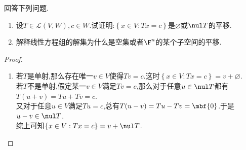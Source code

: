 \documentclass{ctexart}
\begin{document}
\begin{problem}[8.]
    回答下列问题.
    \begin{enumerate}[label=\tbf{(\arabic*)}]
        \item 设$T\in\mathcal{L}(V,W),c\in W$.试证明:$\left\{x\in V:Tx=c\right\}$是$\varnothing$或$\nul T$的平移.
        \item 解释线性方程组的解集为什么是空集或者$\F^n$的某个子空间的平移.
    \end{enumerate}
\end{problem}
\begin{proof}
    \begin{enumerate}[label=\tbf{(\arabic*)}]
        \item 若$T$是单射,那么存在唯一$v\in V$使得$Tv=c$.这时$\left\{x\in V:Tx=c\right\}=v+\varnothing$.\\
            若$T$不是单射,假定某一$v\in V$满足$Tv=c$,那么对于任意$u\in\nul T$都有$T(u+v)=Tu+Tv=c$.\\
            又对于任意$u\in V$满足$Tu=c$,总有$T(u-v)=Tu-Tv=\mbf{0}$.于是$u-v\in\nul T$.\\
            综上可知$\left\{x\in V:Tx=c\right\}=v+\nul T$.
    \end{enumerate}
\end{proof}
\end{document}
